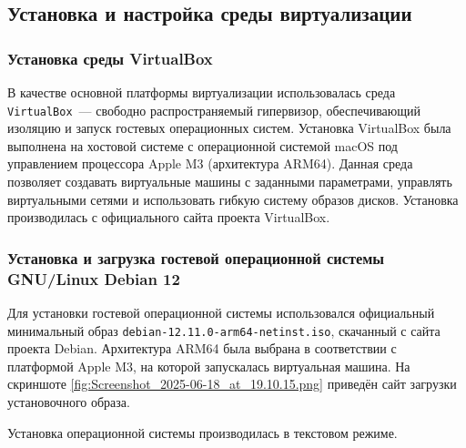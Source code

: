 \subsection{Установка и настройка среды виртуализации}

\subsubsection{Установка среды VirtualBox}

В качестве основной платформы виртуализации использовалась среда \texttt{VirtualBox}~--- свободно распространяемый гипервизор, обеспечивающий изоляцию и запуск гостевых операционных систем. Установка VirtualBox была выполнена на хостовой системе с операционной системой macOS под управлением процессора Apple M3 (архитектура ARM64). Данная среда позволяет создавать виртуальные машины с заданными параметрами, управлять виртуальными сетями и использовать гибкую систему образов дисков. Установка производилась с официального сайта проекта VirtualBox.

\subsubsection{Установка и загрузка гостевой операционной системы GNU/Linux Debian 12}

Для установки гостевой операционной системы использовался официальный минимальный образ \texttt{debian-12.11.0-arm64-netinst.iso}, скачанный с сайта проекта Debian. Архитектура ARM64 была выбрана в соответствии с платформой Apple M3, на которой запускалась виртуальная машина. На скриншоте \ref{fig:Screenshot_2025-06-18_at_19.10.15.png} приведён сайт загрузки установочного образа.


Установка операционной системы производилась в текстовом режиме.

